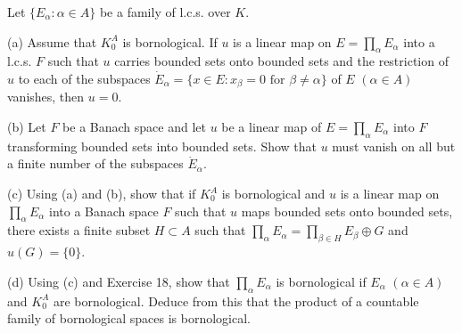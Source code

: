 Let $\{E_\alpha : \alpha \in A\}$ be a family of l.c.s. over $K$.

(a) Assume that $K_0^A$ is bornological. If $u$ is a linear map on $E = \prod_\alpha E_\alpha$ into a l.c.s. $F$ such that $u$ carries bounded sets onto bounded sets and the restriction of $u$ to each of the subspaces $\dot{E}_\alpha = \{x \in E : x_\beta = 0 \text{ for } \beta \neq \alpha\}$ of $E$ $(\alpha \in A)$ vanishes, then $u = 0$.

(b) Let $F$ be a Banach space and let $u$ be a linear map of $E = \prod_\alpha E_\alpha$ into $F$ transforming bounded sets into bounded sets. Show that $u$ must vanish on all but a finite number of the subspaces $\dot{E}_\alpha$.

(c) Using (a) and (b), show that if $K_0^A$ is bornological and $u$ is a linear map on $\prod_\alpha E_\alpha$ into a Banach space $F$ such that $u$ maps bounded sets onto bounded sets, there exists a finite subset $H \subset A$ such that $\prod_\alpha E_\alpha = \prod_{\beta \in H} E_\beta \oplus G$ and $u(G) = \{0\}$.

(d) Using (c) and Exercise 18, show that $\prod_\alpha E_\alpha$ is bornological if $E_\alpha$ $(\alpha \in A)$ and $K_0^A$ are bornological. Deduce from this that the product of a countable family of bornological spaces is bornological.
